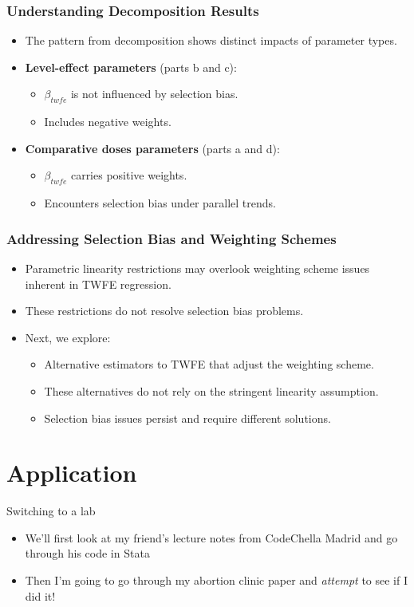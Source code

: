 \documentclass{beamer}
\begin{document}
\begin{frame}
\frametitle{Understanding Decomposition Results}

\begin{itemize}
  \item The pattern from decomposition shows distinct impacts of parameter types.
  \item \textbf{Level-effect parameters} (parts b and c):
    \begin{itemize}
      \item $\beta_{twfe}$ is not influenced by selection bias.
      \item Includes negative weights.
    \end{itemize}
  \item \textbf{Comparative doses parameters} (parts a and d):
    \begin{itemize}
      \item $\beta_{twfe}$ carries positive weights.
      \item Encounters selection bias under parallel trends.
    \end{itemize}
\end{itemize}
\end{frame}


\begin{frame}
\frametitle{Addressing Selection Bias and Weighting Schemes}

\begin{itemize}
  \item Parametric linearity restrictions may overlook weighting scheme issues inherent in TWFE regression.
  \item These restrictions do not resolve selection bias problems.
  \item Next, we explore:
    \begin{itemize}
      \item Alternative estimators to TWFE that adjust the weighting scheme.
      \item These alternatives do not rely on the stringent linearity assumption.
      \item Selection bias issues persist and require different solutions.
    \end{itemize}
\end{itemize}
\end{frame}

\section{Application}

\begin{frame}{Switching to a lab}

\begin{itemize}

\item We'll first look at my friend's lecture notes from CodeChella Madrid and go through his code in Stata
\item Then I'm going to go through my abortion clinic paper and \emph{attempt} to see if I did it!

\end{itemize}

\end{frame}
\end{document}
